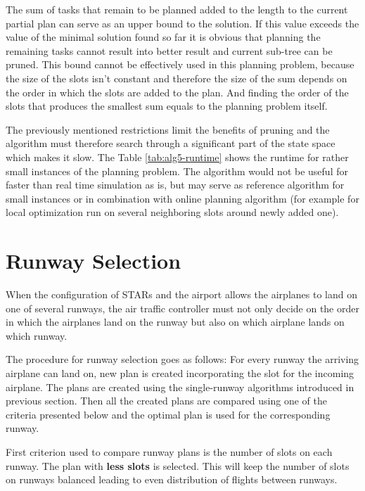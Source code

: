 The sum of tasks that remain to be planned added to the length to the current partial plan can serve as an upper bound to the solution. If this value exceeds the value of the minimal solution found so far it is obvious that planning the remaining tasks cannot result into better result and current sub-tree can be pruned. This bound cannot be effectively used in this planning problem, because the size of the slots isn't constant and therefore the size of the sum depends on the order in which the slots are added to the plan. And finding the order of the slots that produces the smallest sum equals to the planning problem itself.

The previously mentioned restrictions limit the benefits of pruning and the algorithm must therefore search through a significant part of the state space which makes it slow. The Table \ref{tab:alg5-runtime} shows the runtime for rather small instances of the planning problem. The algorithm would not be useful for faster than real time simulation as is, but may serve as reference algorithm for small instances or in combination with online planning algorithm (for example for local optimization run on several neighboring slots around newly added one). 

\section{Runway Selection}

\label{section:runway-selection}

When the configuration of STARs and the airport allows the airplanes to land on one of several runways, the air traffic controller must not only decide on the order in which the airplanes land on the runway but also on which airplane lands on which runway.

The procedure for runway selection goes as follows: For every runway the arriving airplane can land on, new plan is created incorporating the slot for the incoming airplane. The plans are created using the single-runway algorithms introduced in previous section. Then all the created plans are compared using one of the criteria presented below and the optimal plan is used for the corresponding runway.

\bitem
\item First criterion used to compare runway plans is the number of slots on each runway. The plan with \textbf{less slots} is selected. This will keep the number of slots on runways balanced leading to even distribution of flights between runways.

